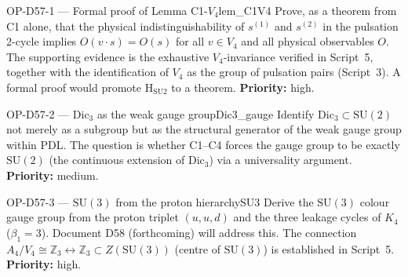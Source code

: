 \documentclass[11pt,a4paper]{article}
\newcommand{\Kfour}{K_4}
\begin{document}
\begin{opbox}{OP-D57-1 --- Formal proof of Lemma C1-$V_4$}{lem_C1V4}
Prove, as a theorem from C1 alone, that the physical indistinguishability of $s^{(1)}$ and $s^{(2)}$ in the pulsation 2-cycle implies $O(v \cdot s) = O(s)$ for all $v \in V_4$ and all physical observables $O$. The supporting evidence is the exhaustive $V_4$-invariance verified in Script~5, together with the identification of $V_4$ as the group of pulsation pairs (Script~3). A formal proof would promote H$_{\mathrm{SU2}}$ to a theorem. \textbf{Priority:} high.
\end{opbox}

\begin{opbox}{OP-D57-2 --- $\mathrm{Dic}_3$ as the weak gauge group}{Dic3_gauge}
Identify $\mathrm{Dic}_3 \subset \mathrm{SU}(2)$ not merely as a subgroup but as the structural generator of the weak gauge group within PDL. The question is whether C1--C4 forces the gauge group to be exactly $\mathrm{SU}(2)$ (the continuous extension of $\mathrm{Dic}_3$) via a universality argument. \textbf{Priority:} medium.
\end{opbox}

\begin{opbox}{OP-D57-3 --- $\mathrm{SU}(3)$ from the proton hierarchy}{SU3}
Derive the $\mathrm{SU}(3)$ colour gauge group from the proton triplet $(u,u,d)$ and the three leakage cycles of $\Kfour$ ($\beta_1 = 3$). Document D58 (forthcoming) will address this. The connection $A_4/V_4 \cong \mathbb{Z}_3 \leftrightarrow \mathbb{Z}_3 \subset Z(\mathrm{SU}(3))$ (centre of $\mathrm{SU}(3)$) is established in Script~5. \textbf{Priority:} high.
\end{opbox}

\clearpage


\end{document}
